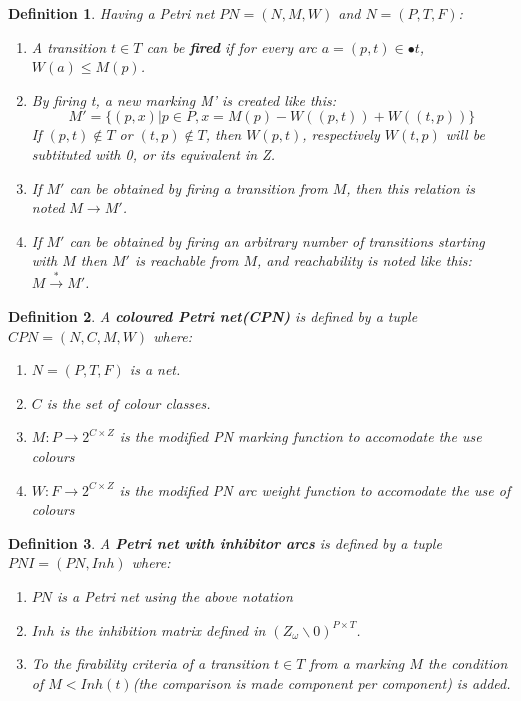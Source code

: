 \documentclass[12pt]{article}
\newtheorem{definition}{Definition}
\begin{document}
    \begin{definition}
        Having a Petri net \(PN=(N,M,W)\) and \(N=(P,T,F)\):  \cite{diaz2013petri}
        \begin{enumerate}
            \item A transition \(t \in T\) can be \textbf{fired} if for every arc \(a=(p,t) \in \bullet t\), \(W(a) \le M(p)\).
            \item By firing t, a new marking M' is created like this: \begin{displaymath}M'=\{(p,x)|p \in P, x = M(p) - W((p,t)) + W((t,p))\}\end{displaymath}
            If \((p,t)\notin T\) or \((t,p)\notin T\), then \(W(p,t)\), respectively \(W(t,p)\) will be subtituted with 0, or its equivalent in Z.
            \item If $M'$ can be obtained by firing a transition from $M$, then this relation is noted \(M \rightarrow M'\). 
            \item If $M'$ can be obtained by firing an arbitrary number of transitions starting with $M$ then $M'$ is reachable from $M$, and reachability is noted like this: \(M \xrightarrow{*} M'\).
        \end{enumerate}
    \end{definition}
    \begin{definition}
        A \textbf{coloured Petri net(CPN)} is defined by a tuple \(CPN=(N,C,M,W)\) where: \cite{girault2013petri}
        \begin{enumerate}
            \item $N=(P,T,F)$ is a net.
            \item \(C\) is the set of colour classes.
            \item \(M: P \rightarrow 2^{C \times Z}\) is the modified PN marking function to accomodate the use colours
            \item \(W: F \rightarrow 2^{C \times Z}\) is the modified PN arc weight function to accomodate the use of colours
        \end{enumerate}
    \end{definition}
    \begin{definition}
        A \textbf{Petri net with inhibitor arcs} is defined by a tuple \(PNI=(PN,Inh)\) where: \cite{diaz2013petri}
        \begin{enumerate}
            \item \(PN\) is a Petri net using the above notation
            \item \(Inh\) is the inhibition matrix defined in \((Z_\omega \backslash 0)^{P\times T}\).
            \item To the firability criteria of a transition \(t \in T\) from a marking $M$ the condition of $M<Inh(t)$(the comparison is made component per component) is added.
        \end{enumerate}
    \end{definition}
\end{document}
